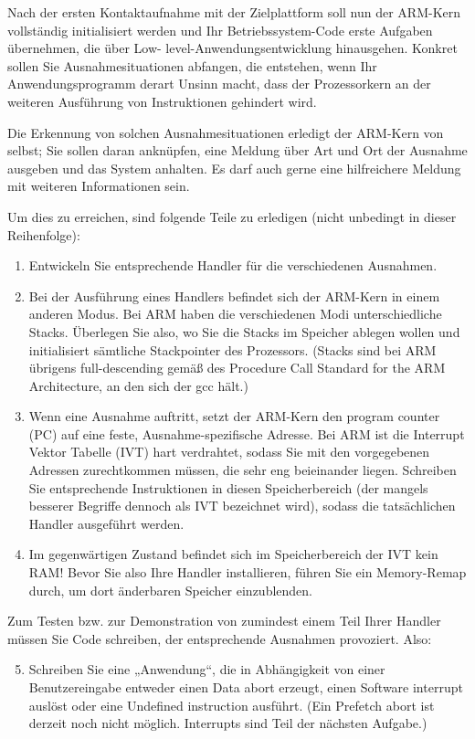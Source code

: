 \begin{description}

Nach der ersten Kontaktaufnahme mit der Zielplattform soll nun der ARM-Kern vollständig
initialisiert werden und Ihr Betriebssystem-Code erste Aufgaben übernehmen, die über Low-
level-Anwendungsentwicklung hinausgehen. Konkret sollen Sie Ausnahmesituationen
abfangen, die entstehen, wenn Ihr Anwendungsprogramm derart Unsinn macht, dass der
Prozessorkern an der weiteren Ausführung von Instruktionen gehindert wird.

Die Erkennung von solchen Ausnahmesituationen erledigt der ARM-Kern von selbst; Sie sollen
daran anknüpfen, eine Meldung über Art und Ort der Ausnahme ausgeben und das System
anhalten. Es darf auch gerne eine hilfreichere Meldung mit weiteren Informationen sein.

Um dies zu erreichen, sind folgende Teile zu erledigen (nicht unbedingt in dieser Reihenfolge):
\begin{enumerate}
	\item Entwickeln Sie entsprechende Handler für die verschiedenen Ausnahmen.
	\item Bei der Ausführung eines Handlers befindet sich der ARM-Kern in einem anderen Modus. Bei ARM haben die verschiedenen Modi unterschiedliche Stacks. Überlegen Sie also, wo Sie die Stacks im Speicher ablegen wollen und initialisiert sämtliche Stackpointer des Prozessors. (Stacks sind bei ARM übrigens full-descending gemäß des Procedure Call Standard for the ARM Architecture, an den sich der gcc hält.)
	\item Wenn eine Ausnahme auftritt, setzt der ARM-Kern den program counter (PC) auf eine feste, Ausnahme-spezifische Adresse. Bei ARM ist die Interrupt Vektor Tabelle (IVT) hart verdrahtet, sodass Sie mit den vorgegebenen Adressen zurechtkommen müssen, die sehr eng beieinander liegen. Schreiben Sie entsprechende Instruktionen in diesen Speicherbereich (der mangels besserer Begriffe dennoch als IVT bezeichnet wird), sodass die tatsächlichen Handler ausgeführt werden.
	\item Im gegenwärtigen Zustand befindet sich im Speicherbereich der IVT kein RAM! Bevor Sie also Ihre Handler installieren, führen Sie ein Memory-Remap durch, um dort änderbaren Speicher einzublenden.\end{enumerate}
Zum Testen bzw. zur Demonstration von zumindest einem Teil Ihrer Handler müssen Sie Code schreiben, der entsprechende Ausnahmen provoziert. Also:
\begin{enumerate}
	\setcounter{enumi}{4}
	\item Schreiben Sie eine „Anwendung“, die in Abhängigkeit von einer Benutzereingabe entweder einen Data abort erzeugt, einen Software interrupt auslöst oder eine Undefined instruction ausführt. (Ein Prefetch abort ist derzeit noch nicht möglich. Interrupts sind Teil der nächsten Aufgabe.)
\end{enumerate}


\end{description}
